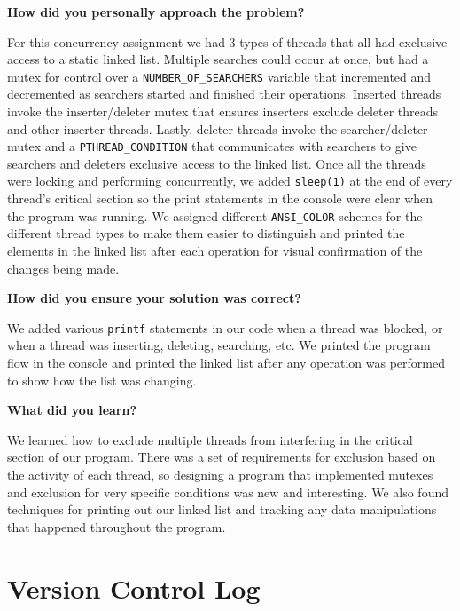 \documentclass[10pt,letterpaper,draftclsnofoot,onecolumn]{IEEEtran}
\begin{document}
\bigskip

\noindent\textbf{How did you personally approach the problem?}
\medskip

\medskip

\noindent For this concurrency assignment we had 3 types of threads that all had exclusive access to a static linked list. Multiple searches could occur at once, but had a mutex for control over a \texttt{NUMBER\_OF\_SEARCHERS} variable that incremented and decremented as searchers started and finished their operations. Inserted threads invoke the inserter/deleter mutex that ensures inserters exclude deleter threads and other inserter threads. Lastly, deleter threads invoke the searcher/deleter mutex and a \texttt{PTHREAD\_CONDITION} that communicates with searchers to give searchers and deleters exclusive access to the linked list. Once all the threads were locking and performing concurrently, we added \texttt{sleep(1)} at the end of every thread's critical section so the print statements in the console were clear when the program was running. We assigned different \texttt{ANSI\_COLOR} schemes for the different thread types to make them easier to distinguish and printed the elements in the linked list after each operation for visual confirmation of the changes being made.

\bigskip

\noindent\textbf{How did you ensure your solution was correct?}
\medskip

\medskip

\noindent We added various \texttt{printf} statements in our code when a thread was blocked, or when a thread was inserting, deleting, searching, etc. We printed the program flow in the console and printed the linked list after any operation was performed to show how the list was changing.
\bigskip

\noindent\textbf{What did you learn?}
\medskip

\medskip

\noindent We learned how to exclude multiple threads from interfering in the critical section of our program. There was a set of requirements for exclusion based on the activity of each thread, so designing a program that implemented mutexes and exclusion for very specific conditions was new and interesting. We also found techniques for printing out our linked list and tracking any data manipulations that happened throughout the program.
\bigskip

\section{Version Control Log}
\bigskip
\end{document}
